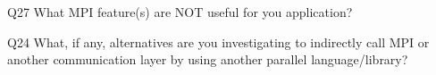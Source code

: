 \begin{description}%
\item{Q27} What MPI feature(s) are NOT useful for you application?%
\item{Q24} What, if any, alternatives are you investigating to indirectly call MPI or another communication layer by using another parallel language/library?%
\end{description}%

